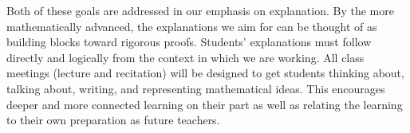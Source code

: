 \documentclass{ximera}
\begin{document}
Both of these goals are addressed in our emphasis on explanation.  By the more mathematically 
advanced, the explanations we aim for can be thought of as building blocks toward rigorous proofs.  
Students' explanations must follow directly and logically from the context in which we are working.  
All class meetings (lecture and recitation) will be designed to get students thinking about, talking 
about, writing, and representing mathematical ideas.  This encourages deeper and more connected 
learning on their part as well as relating the learning to their own preparation as future teachers.  
\end{document}
